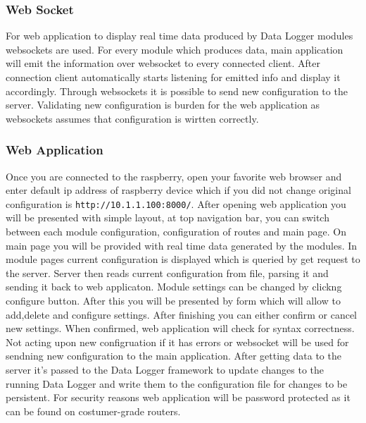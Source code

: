 \subsubsection{Web Socket} %
\label{ssub:web_socket}
For web application to display real time data produced by Data Logger modules websockets are used. For every module which produces data, main application will emit the information over websocket to every connected client. After connection client automatically starts listening for emitted info and display it accordingly. Through websockets it is possible to send new configuration to the server. Validating new configuration is burden for the web application as websockets assumes that configuration is wirtten correctly.
\subsubsection{Web Application} %
\label{ssub:web_application}
Once you are connected to the raspberry, open your favorite web browser and enter default ip address of raspberry device which if you did not change original configuration is \verb|http://10.1.1.100:8000/|. After opening web application you will be presented with simple layout, at top navigation bar, you can switch between each module configuration, configuration of routes and main page. On main page you will be provided with real time data generated by the modules. In module pages current configuration is displayed which is queried by get request to the server. Server then reads current configuration from file, parsing it and sending it back to web applicaton. Module settings can be changed by clickng configure button. After this you will be presented by form which will allow to add,delete and configure settings. After finishing you can either confirm or cancel new settings. When confirmed, web application will check for syntax correctness. Not acting upon new configruation if it has errors or websocket will be used for sendning new configuration to the main application. After getting data to the server it's passed to the Data Logger framework to update changes to the running Data Logger and write them to the configuration file for changes to be persistent. For security reasons web application will be password protected as it can be found on costumer-grade routers.
